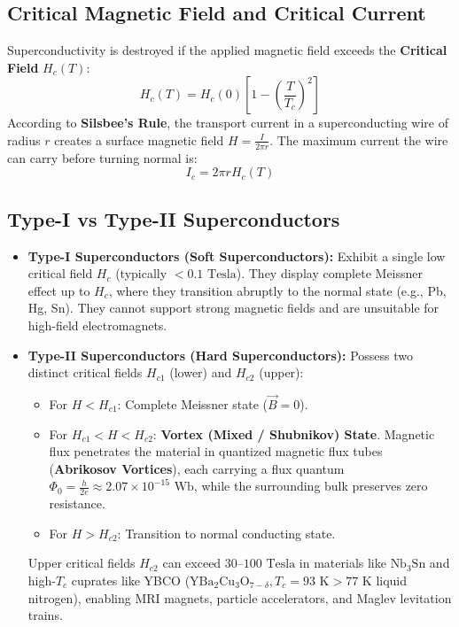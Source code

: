 \subsection{Critical Magnetic Field and Critical Current}
Superconductivity is destroyed if the applied magnetic field exceeds the \textbf{Critical Field} $H_c(T)$:
\begin{equation}
H_c(T) = H_c(0)\left[ 1 - \left(\frac{T}{T_c}\right)^2 \right]
\end{equation}
According to \textbf{Silsbee's Rule}, the transport current in a superconducting wire of radius $r$ creates a surface magnetic field $H = \frac{I}{2\pi r}$. The maximum current the wire can carry before turning normal is:
\begin{equation}
I_c = 2\pi r H_c(T)
\end{equation}

\subsection{Type-I vs Type-II Superconductors}
\begin{itemize}[leftmargin=*,itemsep=3pt]
    \item \textbf{Type-I Superconductors (Soft Superconductors):} Exhibit a single low critical field $H_c$ (typically $< 0.1\text{ Tesla}$). They display complete Meissner effect up to $H_c$, where they transition abruptly to the normal state (e.g., Pb, Hg, Sn). They cannot support strong magnetic fields and are unsuitable for high-field electromagnets.
    \item \textbf{Type-II Superconductors (Hard Superconductors):} Possess two distinct critical fields $H_{c1}$ (lower) and $H_{c2}$ (upper):
    \begin{itemize}
        \item For $H < H_{c1}$: Complete Meissner state ($\vec{B} = 0$).
        \item For $H_{c1} < H < H_{c2}$: \textbf{Vortex (Mixed / Shubnikov) State}. Magnetic flux penetrates the material in quantized magnetic flux tubes (\textbf{Abrikosov Vortices}), each carrying a flux quantum $\Phi_0 = \frac{h}{2e} \approx 2.07 \times 10^{-15}\text{ Wb}$, while the surrounding bulk preserves zero resistance.
        \item For $H > H_{c2}$: Transition to normal conducting state.
    \end{itemize}
    Upper critical fields $H_{c2}$ can exceed $30\text{--}100\text{ Tesla}$ in materials like $\text{Nb}_3\text{Sn}$ and high-$T_c$ cuprates like YBCO ($\text{YBa}_2\text{Cu}_3\text{O}_{7-\delta}, T_c = 93\text{ K} > 77\text{ K}$ liquid nitrogen), enabling MRI magnets, particle accelerators, and Maglev levitation trains.
\end{itemize}

